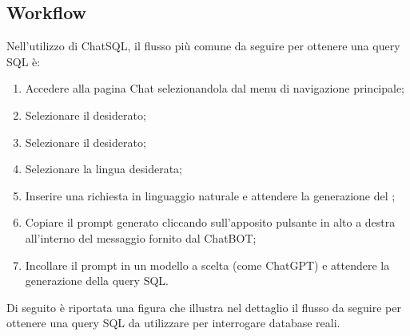 \subsection{Workflow}
\par Nell'utilizzo di ChatSQL, il flusso più comune da seguire per ottenere una query SQL è:
\begin{enumerate}
  \item Accedere alla pagina Chat selezionandola dal menu di navigazione principale;
  \item Selezionare il  desiderato;
  \item Selezionare il  desiderato;
  \item Selezionare la lingua desiderata;
  \item Inserire una richiesta in linguaggio naturale e attendere la generazione del ;
  \item Copiare il prompt generato cliccando sull'apposito pulsante in alto a destra all'interno del messaggio fornito dal ChatBOT;
  \item Incollare il prompt in un modello  a scelta (come ChatGPT) e attendere la generazione della query SQL.
\end{enumerate}

\vspace{\baselineskip}
\par Di seguito è riportata una figura che illustra nel dettaglio il flusso da seguire per ottenere una query SQL da utilizzare per interrogare database reali.

